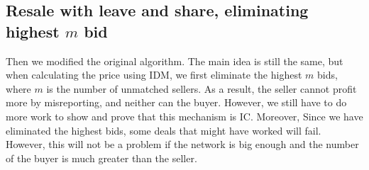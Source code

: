 \subsection*{Resale with leave and share, eliminating highest \(m\) bid}
Then we modified the original algorithm. The main idea is still the same, but when calculating
the price using IDM, we first eliminate the highest \(m\) bids, where \(m\) is the number of unmatched sellers.
As a result, the seller cannot profit more by misreporting, and neither can the buyer. However, we still have to do
more work to show and prove that this mechanism is IC.
Moreover, Since we have eliminated the highest bids, some deals that might have worked will fail.
However, this will not be a problem if the network is big enough and the number of the buyer is much greater than the seller.